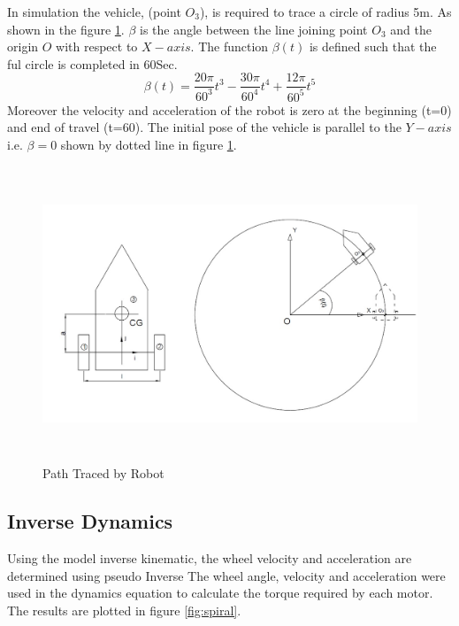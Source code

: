 In  simulation the vehicle, (point $O_3$), is required to trace a circle of radius 5m. As shown in the figure \ref{fig:CirTrace}. $ \beta$ is the angle between the line joining  point $O_3$ and the origin $O$ with respect to $X-axis$. The function $\beta(t)$ is defined such that the ful circle is completed in 60Sec. 
\begin{equation}
\label{path}
\beta(t)=\frac{20\pi}{60^3}t^3-\frac{30\pi}{60^4}t^4+\frac{12\pi}{60^5}t^5
\end{equation}
Moreover the velocity and acceleration of the robot is zero at the beginning (t=0) and end of travel (t=60). The initial pose of the vehicle is parallel to the $Y-axis$ i.e. $\beta=0$  shown  by dotted line in figure \ref{fig:CirTrace}.

\begin{figure}[H]
	\centering
		\includegraphics[height=250pt,keepaspectratio]{Chapter4/fig/pathCircle}
		\caption{Path Traced by Robot}
	\label{fig:CirTrace}
\end{figure}



\subsection{Inverse Dynamics}
Using the model inverse kinematic,  the wheel velocity and acceleration are determined using pseudo Inverse  %
The wheel angle, velocity and acceleration were used in the dynamics equation  to calculate the torque required by each motor. The results are plotted in figure \ref{fig:spiral}. 

